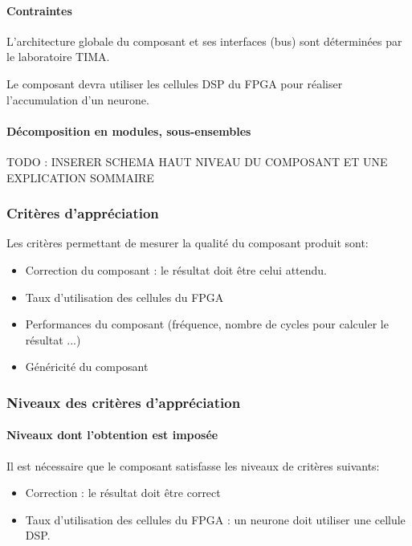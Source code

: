 \paragraph{Contraintes\\}

L'architecture globale du composant et ses interfaces (bus) sont déterminées
par le laboratoire TIMA.

Le composant devra utiliser les cellules DSP du FPGA pour réaliser l'accumulation
d'un neurone.

\paragraph{Décomposition en modules, sous-ensembles\\}

TODO : INSERER SCHEMA HAUT NIVEAU DU COMPOSANT
ET UNE EXPLICATION SOMMAIRE

\subsubsection{Critères d’appréciation}

Les critères permettant de mesurer la qualité du composant produit sont:
\begin{itemize}
	\item Correction du composant : le résultat doit être celui attendu.
	\item Taux d'utilisation des cellules du FPGA
	\item Performances du composant (fréquence, nombre de cycles pour
		calculer le résultat ...)
	\item Généricité du composant
\end{itemize}

\subsubsection{Niveaux des critères d’appréciation}

\paragraph{Niveaux dont l’obtention est imposée\\}

Il est nécessaire que le composant satisfasse les niveaux de critères suivants:
\begin{itemize}
	\item Correction : le résultat doit être correct
	\item Taux d'utilisation des cellules du FPGA : un neurone doit utiliser
		une cellule DSP.
\end{itemize}

